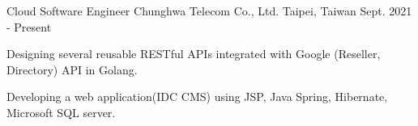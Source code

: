 

\begin{cventries}

  \cventry
    {Cloud Software Engineer} %
    {Chunghwa Telecom Co., Ltd.} %
    {Taipei, Taiwan} %
    {Sept. 2021 - Present} %
    {
      \begin{cvitems} %
        \item {Designing several reusable RESTful APIs integrated with Google (Reseller, Directory) API in Golang.}
        \item {Developing a web application(IDC CMS) using JSP, Java Spring, Hibernate, Microsoft SQL server.}
      \end{cvitems}
    }


\end{cventries}
